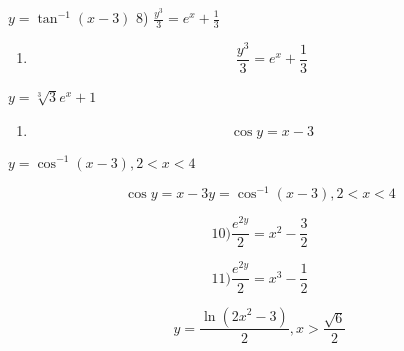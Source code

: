 \documentclass[
]{article}
\providecommand{\tightlist}{%
  \setlength{\itemsep}{0pt}\setlength{\parskip}{0pt}}
\begin{document}
\(y = \tan^{-1}(x - 3)\) 8) \(\frac{y^3}{3} = e^x + \frac{1}{3}\)

\begin{enumerate}
\def\labelenumi{\arabic{enumi})}
\setcounter{enumi}{7}
\tightlist
\item
  \[\frac{y^3}{3} = e^x + \frac{1}{3}\]
\end{enumerate}

\(y = \sqrt[3]{3}e^x + 1\)

\begin{enumerate}
\def\labelenumi{\arabic{enumi})}
\setcounter{enumi}{8}
\tightlist
\item
  \[\cos y = x - 3\]
\end{enumerate}

\(y = \cos^{-1}(x - 3), 2 < x < 4\)

\[\cos y = x - 3 y = \cos^{-1}(x - 3), 2 < x < 4\]

\[10) \frac{e^{2y}}{2} = x^2 - \frac{3}{2}\]

\[11) \frac{e^{2y}}{2} = x^3 - \frac{1}{2}\]

\[y = \frac{\ln(2x^2 - 3)}{2}, x > \frac{\sqrt{6}}{2}\]
\end{document}

